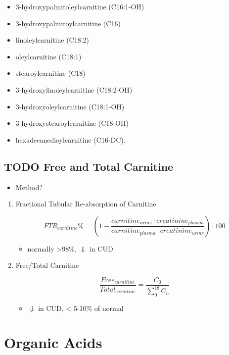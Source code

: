 \documentclass{scrartcl}
\begin{document}
\begin{enumerate}
\begin{itemize}
\item 3-hydroxypalmitoleylcarnitine (C16:1-OH)
\item 3-hydroxypalmitoylcarnitine (C16)
\item linoleylcarnitine (C18:2)
\item oleylcarnitine (C18:1)
\item stearoylcarnitine (C18)
\item 3-hydroxylinoleylcarnitine (C18:2-OH)
\item 3-hydroxyoleylcarnitine (C18:1-OH)
\item 3-hydroxystearoylcarnitine (C18-OH)
\item hexadecanedioylcarnitine (C16-DC).
\end{itemize}
\end{enumerate}


\subsection{{\bfseries\sffamily TODO} Free and Total Carnitine}
\label{sec:orgc776266}
\begin{itemize}
\item Method?
\end{itemize}
\begin{enumerate}
\item Fractional Tubular Re-absorption of Carnitine
\label{sec:orgaaa7911}

\begin{equation*}
FTR_{carnitine}\% = \left( 1 -  \frac{carnitine_{urine} \cdot creatinine_{plasma}}{carnitine_{plasma} \cdot creatinine_{urine}}\right) \cdot 100
\end{equation*}

\begin{itemize}
\item normally >98\%, \(\Downarrow\) in CUD
\end{itemize}

\item Free/Total Carnitine
\label{sec:org95ce6bd}

\[
\frac{Free_{carnitine}}{Total_{carnitine}} = \frac{C_0}{\sum_{0}^{18} C_n}
\]

\begin{itemize}
\item \(\Downarrow\) in CUD, < 5-10\% of normal
\end{itemize}
\end{enumerate}
\section{Organic Acids}
\label{sec:org581bac6}
\end{document}
